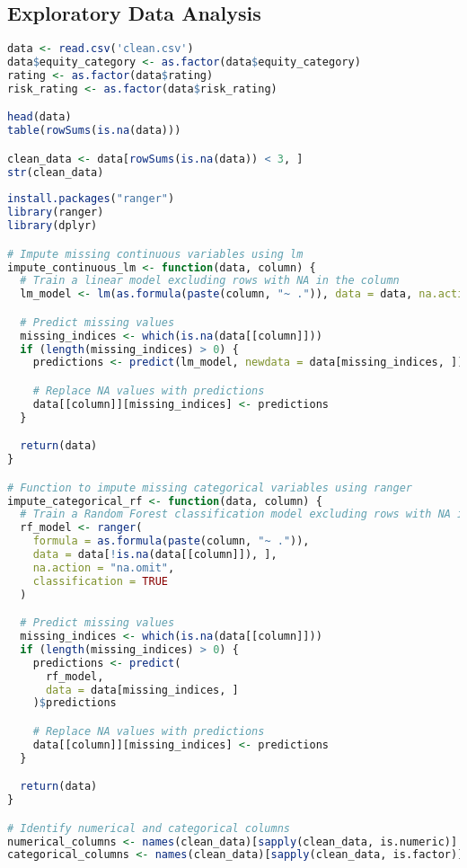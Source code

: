 \subsection{Exploratory Data Analysis}
\begin{lstlisting}[language=R, breaklines=true, basicstyle=\ttfamily\small, columns=fullflexible]
data <- read.csv('clean.csv')
data$equity_category <- as.factor(data$equity_category)
rating <- as.factor(data$rating)
risk_rating <- as.factor(data$risk_rating)

head(data)     
table(rowSums(is.na(data)))

clean_data <- data[rowSums(is.na(data)) < 3, ]
str(clean_data)
     
install.packages("ranger")
library(ranger)
library(dplyr)

# Impute missing continuous variables using lm
impute_continuous_lm <- function(data, column) {
  # Train a linear model excluding rows with NA in the column
  lm_model <- lm(as.formula(paste(column, "~ .")), data = data, na.action = na.exclude)

  # Predict missing values
  missing_indices <- which(is.na(data[[column]]))
  if (length(missing_indices) > 0) {
    predictions <- predict(lm_model, newdata = data[missing_indices, ])

    # Replace NA values with predictions
    data[[column]][missing_indices] <- predictions
  }

  return(data)
}

# Function to impute missing categorical variables using ranger
impute_categorical_rf <- function(data, column) {
  # Train a Random Forest classification model excluding rows with NA in the column
  rf_model <- ranger(
    formula = as.formula(paste(column, "~ .")),
    data = data[!is.na(data[[column]]), ],
    na.action = "na.omit",
    classification = TRUE
  )

  # Predict missing values
  missing_indices <- which(is.na(data[[column]]))
  if (length(missing_indices) > 0) {
    predictions <- predict(
      rf_model,
      data = data[missing_indices, ]
    )$predictions

    # Replace NA values with predictions
    data[[column]][missing_indices] <- predictions
  }

  return(data)
}

# Identify numerical and categorical columns
numerical_columns <- names(clean_data)[sapply(clean_data, is.numeric)]
categorical_columns <- names(clean_data)[sapply(clean_data, is.factor)]


\end{lstlisting}
